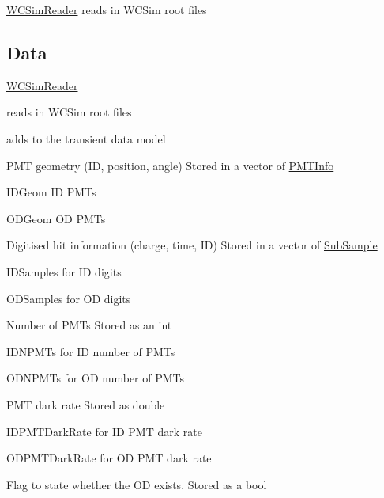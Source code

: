 \hyperlink{classWCSimReader}{W\-C\-Sim\-Reader} reads in W\-C\-Sim root files

\subsection*{Data}

\hyperlink{classWCSimReader}{W\-C\-Sim\-Reader}
\begin{DoxyItemize}
\item reads in W\-C\-Sim root files
\item adds to the transient data model
\begin{DoxyItemize}
\item P\-M\-T geometry (I\-D, position, angle) Stored in a {\ttfamily vector} of {\ttfamily \hyperlink{classPMTInfo}{P\-M\-T\-Info}}
\begin{DoxyItemize}
\item {\ttfamily I\-D\-Geom} I\-D P\-M\-Ts
\item {\ttfamily O\-D\-Geom} O\-D P\-M\-Ts
\end{DoxyItemize}
\item Digitised hit information (charge, time, I\-D) Stored in a {\ttfamily vector} of {\ttfamily \hyperlink{classSubSample}{Sub\-Sample}}
\begin{DoxyItemize}
\item {\ttfamily I\-D\-Samples} for I\-D digits
\item {\ttfamily O\-D\-Samples} for O\-D digits
\end{DoxyItemize}
\item Number of P\-M\-Ts Stored as an {\ttfamily int}
\begin{DoxyItemize}
\item {\ttfamily I\-D\-N\-P\-M\-Ts} for I\-D number of P\-M\-Ts
\item {\ttfamily O\-D\-N\-P\-M\-Ts} for O\-D number of P\-M\-Ts
\end{DoxyItemize}
\item P\-M\-T dark rate Stored as {\ttfamily double}
\begin{DoxyItemize}
\item {\ttfamily I\-D\-P\-M\-T\-Dark\-Rate} for I\-D P\-M\-T dark rate
\item {\ttfamily O\-D\-P\-M\-T\-Dark\-Rate} for O\-D P\-M\-T dark rate
\end{DoxyItemize}
\item Flag to state whether the O\-D exists. Stored as a {\ttfamily bool}
\begin{DoxyItemize}

\end{DoxyItemize}
\end{DoxyItemize}
\end{DoxyItemize}
